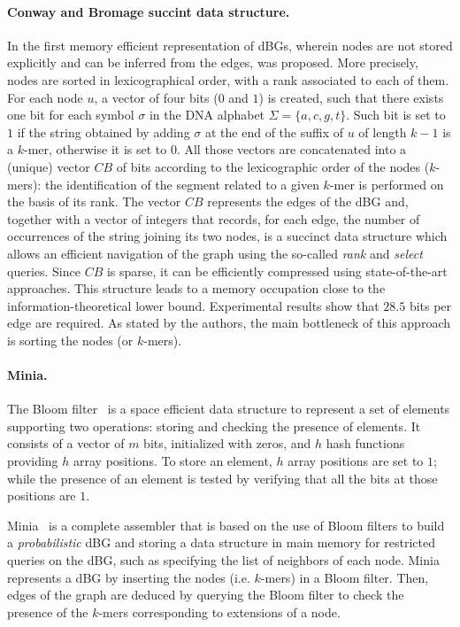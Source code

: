 \documentclass[11pt,oneside,a4paper]{article}
\begin{document}
\paragraph{Conway and Bromage succint data structure.}
In \cite{Conway15022011} the first memory efficient
representation of dBGs, wherein nodes are not stored explicitly and can be inferred from the edges, was proposed.
More precisely, nodes are sorted in lexicographical order, with a rank associated to each of them.
For each node $u$, a vector of four bits ($0$ and $1$) is created, such that there exists one bit for each symbol $\sigma$ in the DNA alphabet $\Sigma=\{a,c,g,t\}$.
Such bit is set to $1$ if the string obtained by adding $\sigma$ at the end of the suffix of $u$ of length $k-1$ is a $k$-mer, otherwise it is set to $0$.
All those vectors are concatenated into a (unique) vector $CB$ of bits according to the lexicographic order of the nodes ($k$-mers): the identification of the segment related to a given $k$-mer is performed on the basis of its rank.
The vector $CB$ represents the edges of the dBG and, together with a vector of integers that records,
for each edge, the number of occurrences of the string joining its two nodes, 
is a succinct data structure which allows an efficient navigation of the graph using the so-called \emph{rank} and \emph{select} queries.
Since $CB$ is sparse, it can be efficiently compressed using state-of-the-art approaches.
This structure leads to a memory occupation close to the information-theoretical lower bound.
Experimental results show that $28.5$ bits per edge are required.
As stated by the authors, the main bottleneck of this approach is sorting the nodes (or $k$-mers).

\paragraph{Minia.}
The Bloom filter~\cite{Bloom:1970:STH:362686.362692} is a space efficient data structure to represent a set of elements supporting two operations: storing and checking the presence of elements.
It consists of a vector of $m$ bits, initialized with zeros, and $h$ hash functions providing $h$ array positions.
To store an element, $h$ array positions are set to $1$; while the presence of an element is tested by verifying that all the bits at those positions are $1$.

Minia~\cite{DBLP:journals/almob/ChikhiR13} is a complete assembler that is based on the use of Bloom filters to build a \emph{probabilistic} dBG and storing a data structure in main memory for restricted queries on the dBG, such as specifying the list of  neighbors of each node.
Minia represents a dBG by inserting the nodes (i.e. $k$-mers) in a Bloom filter. Then, edges of the graph are deduced by querying the Bloom filter to check the presence of the $k$-mers corresponding to extensions of a node.
\end{document}
